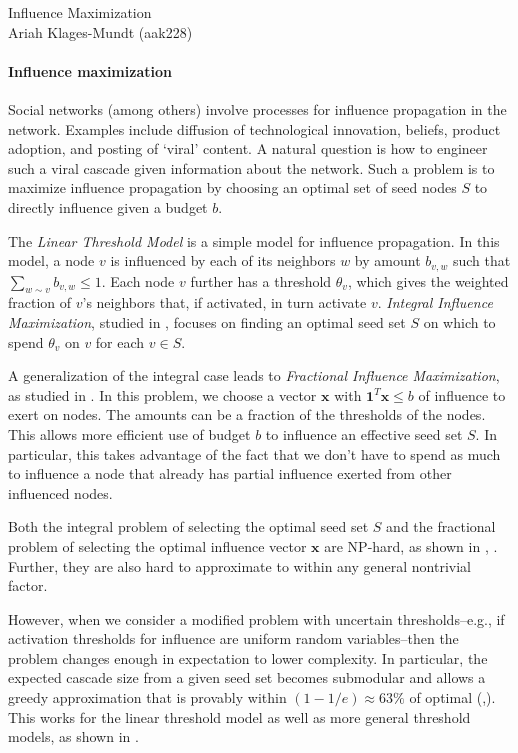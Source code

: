 \documentclass[11pt]{article}
\newcommand{\yourtitle}{Influence Maximization}
\begin{document}
\newcommand{\Half}{\frac{1}{2}}



\begin{center}\LARGE\yourtitle\\
\large Ariah Klages-Mundt (aak228)
\end{center}

\paragraph{Influence maximization}
Social networks (among others) involve processes for influence propagation in the network. Examples include diffusion of technological innovation, beliefs, product adoption, and posting of `viral' content. A natural question is how to engineer such a viral cascade given information about the network. Such a problem is to maximize influence propagation by choosing an optimal set of seed nodes $S$ to directly influence given a budget $b$.

The {\em Linear Threshold Model} is a simple model for influence propagation. In this model, a node $v$ is influenced by each of its neighbors $w$ by amount $b_{v,w}$ such that $\sum_{w\sim v} b_{v,w} \leq 1$. Each node $v$ further has a threshold $\theta_v$, which gives the weighted fraction of $v$'s neighbors that, if activated, in turn activate $v$. {\em Integral Influence Maximization}, studied in \cite{kempe03}, focuses on finding an optimal seed set $S$ on which to spend $\theta_v$ on $v$ for each $v\in S$.

A generalization of the integral case leads to {\em Fractional Influence Maximization}, as studied in \cite{demaine14}. In this problem, we choose a vector $\mathbf{x}$ with $\mathbf{1}^T \mathbf{x}\leq b$ of influence to exert on nodes. The amounts can be a fraction of the thresholds of the nodes. This allows more efficient use of budget $b$ to influence an effective seed set $S$. In particular, this takes advantage of the fact that we don't have to spend as much to influence a node that already has partial influence exerted from other influenced nodes.


Both the integral problem of selecting the optimal seed set $S$ and the fractional problem of selecting the optimal influence vector $\mathbf{x}$ are NP-hard, as shown in \cite{kempe03}, \cite{demaine14}. Further, they are also hard to approximate to within any general nontrivial factor.

However, when we consider a modified problem with uncertain thresholds--e.g., if activation thresholds for influence are uniform random variables--then the problem changes enough in expectation to lower complexity. In particular, the expected cascade size from a given seed set becomes submodular and allows a greedy approximation that is provably within $(1-1/e)\approx 63\%$ of optimal (\cite{kempe03},\cite{demaine14}). This works for the linear threshold model as well as more general threshold models, as shown in \cite{mossel07}.
\end{document}
